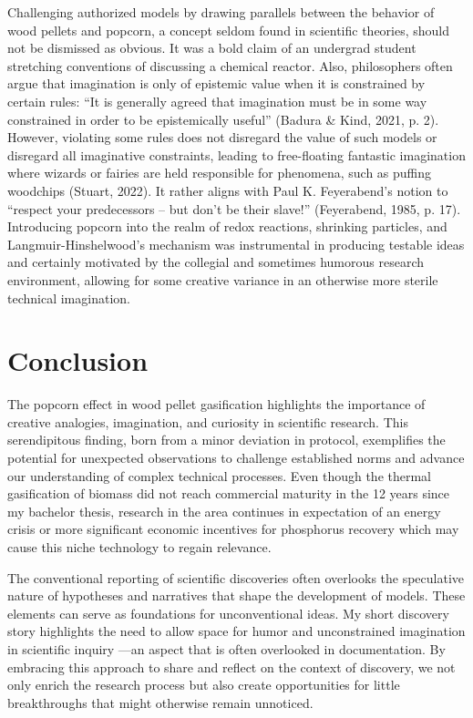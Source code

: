 \documentclass[authordate, anecdote]{jote-new-article}
\begin{document}
	Challenging authorized models by drawing parallels between the behavior of wood pellets and popcorn, a concept seldom found in scientific theories, should not be dismissed as obvious. It was a bold claim of an undergrad student stretching conventions of discussing a chemical reactor. Also, philosophers often argue that imagination is only of epistemic value when it is constrained by certain rules: “It is generally agreed that imagination must be in some way constrained in order to be epistemically useful” (Badura \& Kind, 2021, p. 2). However, violating some rules does not disregard the value of such models or disregard all imaginative constraints, leading to free-floating fantastic imagination where wizards or fairies are held responsible for phenomena, such as puffing woodchips (Stuart, 2022). It rather aligns with Paul K. Feyerabend's notion to “respect your predecessors -- but don't be their slave!” (Feyerabend, 1985, p. 17). Introducing popcorn into the realm of redox reactions, shrinking particles, and Langmuir-Hinshelwood's mechanism was instrumental in producing testable ideas and certainly motivated by the collegial and sometimes humorous research environment, allowing for some creative variance in an otherwise more sterile technical imagination.



	\section{Conclusion}



	The popcorn effect in wood pellet gasification highlights the importance of creative analogies, imagination, and curiosity in scientific research. This serendipitous finding, born from a minor deviation in protocol, exemplifies the potential for unexpected observations to challenge established norms and advance our understanding of complex technical processes. Even though the thermal gasification of biomass did not reach commercial maturity in the 12 years since my bachelor thesis, research in the area continues in expectation of an energy crisis or more significant economic incentives for phosphorus recovery which may cause this niche technology to regain relevance.



	The conventional reporting of scientific discoveries often overlooks the speculative nature of hypotheses and narratives that shape the development of models. These elements can serve as foundations for unconventional ideas. My short discovery story highlights the need to allow space for humor and unconstrained imagination in scientific inquiry —an aspect that is often overlooked in documentation. By embracing this approach to share and reflect on the context of discovery, we not only enrich the research process but also create opportunities for little breakthroughs that might otherwise remain unnoticed.
\end{document}
